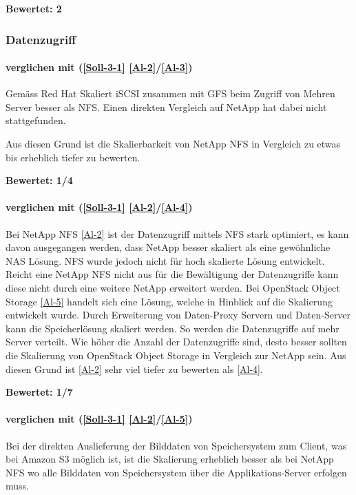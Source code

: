 \textbf{Bewertet: 2}


\subsubsection{Datenzugriff}

\paragraph*{  verglichen mit  (\ref{Soll-3-1} \ref{Al-2}/\ref{Al-3})}
Gemäss Red Hat Skaliert iSCSI zusammen mit GFS beim Zugriff von Mehren Server besser als NFS. Einen direkten Vergleich auf NetApp hat dabei nicht stattgefunden. 
\cite{O'Keefe2005}

Aus diesen Grund ist die Skalierbarkeit von NetApp NFS  in Vergleich zu  etwas bis erheblich tiefer zu bewerten.

\textbf{Bewertet: 1/4}

\paragraph*{  verglichen mit  (\ref{Soll-3-1} \ref{Al-2}/\ref{Al-4})}
Bei NetApp NFS \ref{Al-2} ist der Datenzugriff mittels NFS stark optimiert, es kann davon ausgegangen werden, dass NetApp besser skaliert als eine gewöhnliche NAS Lösung. NFS wurde jedoch nicht für hoch skalierte Lösung entwickelt. Reicht eine NetApp NFS nicht aus für die Bewältigung der Datenzugriffe kann diese nicht durch eine weitere NetApp erweitert werden. Bei OpenStack Object Storage \ref{Al-5} handelt sich eine Lösung, welche in Hinblick auf die Skalierung entwickelt wurde. Durch Erweiterung von Daten-Proxy Servern und Daten-Server kann die Speicherlösung skaliert werden. So werden die Datenzugriffe auf mehr Server verteilt. Wie höher die Anzahl der Datenzugriffe sind, desto besser sollten die Skalierung von OpenStack Object Storage in Vergleich zur NetApp sein.
Aus diesen Grund ist \ref{Al-2} sehr viel tiefer zu bewerten als \ref{Al-4}.

\textbf{Bewertet: 1/7}

\paragraph*{  verglichen mit  (\ref{Soll-3-1} \ref{Al-2}/\ref{Al-5})}
Bei der direkten Auslieferung der Bilddaten von Speichersystem zum Client, was bei Amazon S3 möglich ist, ist die Skalierung erheblich besser als bei NetApp NFS wo alle Bilddaten von Speichersystem über die Applikations-Server erfolgen muss. 

